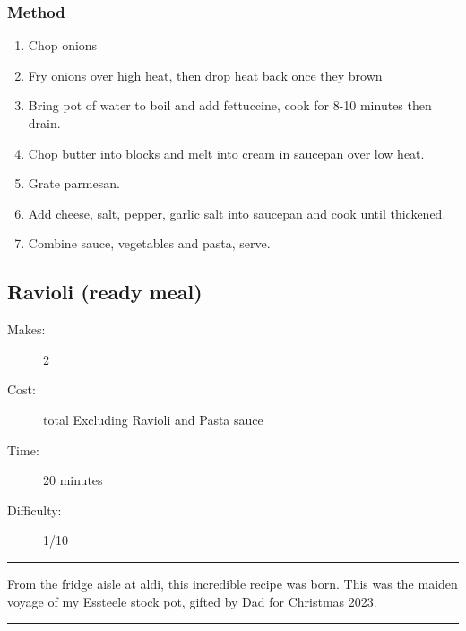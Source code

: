 \documentclass[]{article}
\begin{document}
\subsubsection*{\Large Method}
\begin{enumerate}[font=\huge\color{accent}]
	\item Chop onions
	\item Fry onions over high heat, then drop heat back once they brown
	\item Bring pot of water to boil and add fettuccine, cook for 8-10 minutes then drain.
	\item Chop butter into blocks and melt into cream in saucepan over low heat.
	\item Grate parmesan.
	\item Add cheese, salt, pepper, garlic salt into saucepan and cook until thickened.
	\item Combine sauce, vegetables and pasta, serve.
\end{enumerate}
\newpage
{}\label{rec:Ravioli (ready meal)}
\subsection*{\center\huge Ravioli (ready meal)}
\begin{description}
\item[Makes:] 2 
\item[Cost:]  total Excluding Ravioli and Pasta sauce
\item[Time:] 20 minutes
\item[Difficulty:] 1/10
\end{description}
\vspace{0.2cm}\hrule\vspace{0.5cm}
\begin{adjustwidth}{0.5 cm}{0.5 cm}

From the fridge aisle at aldi, this incredible recipe was born. This was the maiden voyage of my Essteele stock pot, gifted by Dad for Christmas 2023. \hfill{}\color{black}

\end{adjustwidth}
\vspace{0.5cm}\hrule
\end{document}
